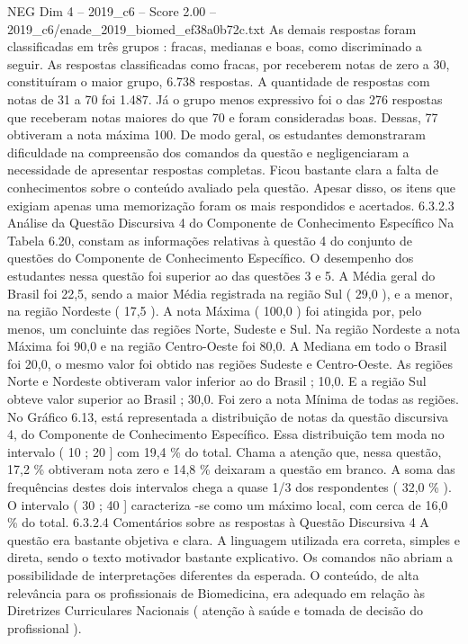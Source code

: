\begin{textsample}{NEG Dim 4 – 2019\_c6 – Score 2.00 – 2019\_c6/enade\_2019\_biomed\_ef38a0b72c.txt}
As demais respostas foram classificadas em três grupos : fracas, medianas e boas, como discriminado a seguir.
As respostas classificadas como fracas, por receberem notas de zero a 30, constituíram o maior grupo, 6.738 respostas.
A quantidade de respostas com notas de 31 a 70 foi 1.487.
Já o grupo menos expressivo foi o das 276 respostas que receberam notas maiores do que 70 e foram consideradas boas.
Dessas, 77 obtiveram a nota máxima 100.
De modo geral, os estudantes demonstraram dificuldade na compreensão dos comandos da questão e negligenciaram a necessidade de apresentar respostas completas.
Ficou bastante clara a falta de conhecimentos sobre o conteúdo avaliado pela questão.
Apesar disso, os itens que exigiam apenas uma memorização foram os mais respondidos e acertados. 6.3.2.3 Análise da Questão Discursiva 4 do Componente de Conhecimento Específico Na Tabela 6.20, constam as informações relativas à questão 4 do conjunto de questões do Componente de Conhecimento Específico.
O desempenho dos estudantes nessa questão foi superior ao das questões 3 e 5.
A Média geral do Brasil foi 22,5, sendo a maior Média registrada na região Sul ( 29,0 ), e a menor, na região Nordeste ( 17,5 ).
A nota Máxima ( 100,0 ) foi atingida por, pelo menos, um concluinte das regiões Norte, Sudeste e Sul.
Na região Nordeste a nota Máxima foi 90,0 e na região Centro-Oeste foi 80,0.
A Mediana em todo o Brasil foi 20,0, o mesmo valor foi obtido nas regiões Sudeste e Centro-Oeste.
As regiões Norte e Nordeste obtiveram valor inferior ao do Brasil ; 10,0.
E a região Sul obteve valor superior ao Brasil ; 30,0.
Foi zero a nota Mínima de todas as regiões.
No Gráfico 6.13, está representada a distribuição de notas da questão discursiva 4, do Componente de Conhecimento Específico.
Essa distribuição tem moda no intervalo ( 10 ; 20 ] com 19,4 \% do total.
Chama a atenção que, nessa questão, 17,2 \% obtiveram nota zero e 14,8 \% deixaram a questão em branco.
A soma das frequências destes dois intervalos chega a quase 1/3 dos respondentes ( 32,0 \% ).
O intervalo ( 30 ; 40 ] caracteriza -se como um máximo local, com cerca de 16,0 \% do total. 6.3.2.4 Comentários sobre as respostas à Questão Discursiva 4 A questão era bastante objetiva e clara.
A linguagem utilizada era correta, simples e direta, sendo o texto motivador bastante explicativo.
Os comandos não abriam a possibilidade de interpretações diferentes da esperada.
O conteúdo, de alta relevância para os profissionais de Biomedicina, era adequado em relação às Diretrizes Curriculares Nacionais ( atenção à saúde e tomada de decisão do profissional ).

\end{textsample}
